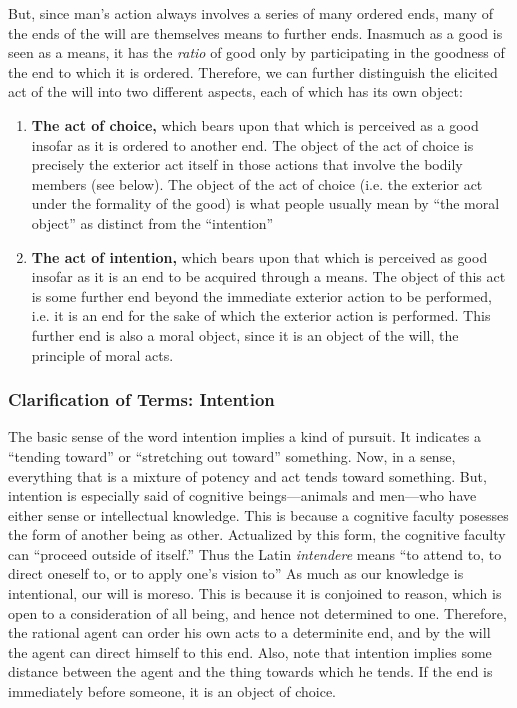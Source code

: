 \documentclass{article}
\begin{document}
But, since man's action always involves a series of many
ordered ends, many of the ends of the will are themselves means to further ends.  Inasmuch as a good is seen as a means,
it has the \emph{ratio} of good only by participating in the goodness of the end to which it is ordered.  Therefore, we
can further distinguish the elicited act of the will into two different aspects, each of which has its own object:

\begin{enumerate}

    \item \textbf{The act of choice,} which bears upon that which is perceived as a good insofar as it is
        ordered to another end.  The object of the act of choice is precisely the exterior act itself in those actions
        that involve the bodily members (see below).  The object of the act of choice (i.e. the exterior act under the
        formality of the good) is what people usually mean by ``the moral object'' as distinct from the ``intention''

    \item \textbf{The act of intention,} which bears upon that which is perceived as good insofar as it is an end to be
        acquired through a means.  The object of this act is some further end beyond the immediate exterior action to be
        performed, i.e. it is an end for the sake of which the exterior action is performed.  This further end is also a
        moral object, since it is an object of the will, the principle of moral acts.

\end{enumerate}

\subsubsection{Clarification of Terms:  Intention}

The basic sense of the word intention implies a kind of pursuit.  It indicates a ``tending toward'' or ``stretching out
toward'' something.  Now, in a sense, everything that is a mixture of potency and act tends toward something.  But,
intention is especially said of cognitive beings---animals and men---who have either sense or intellectual knowledge.
This is because a cognitive faculty posesses the form of another being as other.  Actualized by this form, the cognitive
faculty can ``proceed outside of itself.''  Thus the Latin \emph{intendere} means ``to attend to, to direct oneself to,
or to apply one's vision to''  As much as our knowledge is intentional, our will is moreso.  This is because it is
conjoined to reason, which is open to a consideration of all being, and hence not determined to one.  Therefore, the
rational agent can order his own acts to a determinite end, and by the will the agent can direct himself to this end.
Also, note that intention implies some distance between the agent and the thing towards which he tends.  If the end is
immediately before someone, it is an object of choice.
\end{document}
